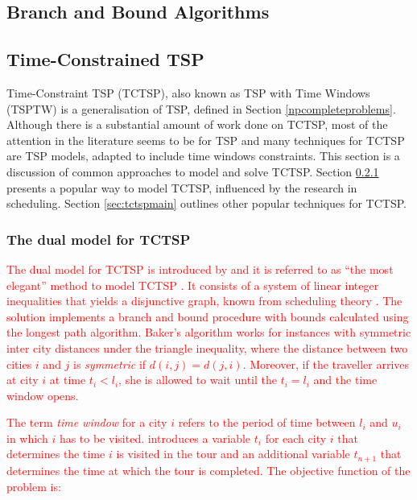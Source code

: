 \documentclass{mprop}
\theoremstyle{definition}
\begin{document}
\subsection{Branch and Bound Algorithms}
\label{branchandbound}

\subsection{Time-Constrained TSP}
\label{sec:tctspalgos}
Time-Constraint TSP (TCTSP), also known as TSP with Time Windows (TSPTW) is a generalisation of TSP, defined in Section \ref{npcompleteproblems}.
Although there is a substantial amount of work done on TCTSP, most of the attention in the literature seems to be for TSP \citep{tspbible} and many techniques for TCTSP are TSP models, adapted to include time windows constraints. This section is a discussion of common approaches to model and solve TCTSP. Section \ref{sec:baker83} presents a popular way to model TCTSP, influenced by the research in scheduling. Section \ref{sec:tctspmain} outlines other popular techniques for TCTSP.

\subsubsection{The dual model for TCTSP}
\label{sec:baker83}

\textcolor{red}{The dual model for TCTSP is introduced by \citet{Baker83} and it is referred to as ``the most elegant'' method to model TCTSP \citep{Chan05}. It consists of a system of linear integer inequalities that yields a disjunctive graph, known from scheduling theory \citep{Baker83}. The solution implements a branch and bound procedure with bounds calculated using the longest path algorithm. Baker's algorithm works for instances with symmetric inter city distances under the triangle inequality, where the distance between two cities $i$ and $j$ is \textit{symmetric} if $d(i, j) = d(j, i)$. Moreover, if the traveller arrives at city $i$ at time $t_{i} < l_{i}$, she is allowed to wait until the $t_{i} = l_{i}$ and the time window opens.}

\textcolor{red}{The term \textit{time window} for a city $i$ refers to the period of time between $l_{i}$ and $u_{i}$ in which $i$ has to be visited. \citet{Baker83} introduces a variable $t_{i}$ for each city $i$ that determines the time $i$ is visited in the tour and an additional variable $t_{n+1}$ that determines the time at which the tour is completed. The objective function of the problem is:}
\end{document}
